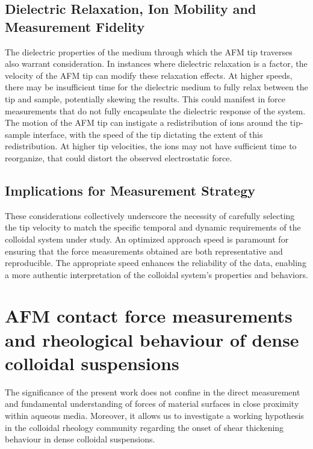 \subsection{Dielectric Relaxation, Ion Mobility and Measurement Fidelity}
The dielectric properties of the medium through which the AFM tip traverses also warrant consideration. In instances where dielectric relaxation is a factor, the velocity of the AFM tip can modify these relaxation effects. At higher speeds, there may be insufficient time for the dielectric medium to fully relax between the tip and sample, potentially skewing the results. This could manifest in force measurements that do not fully encapsulate the dielectric response of the system. The motion of the AFM tip can instigate a redistribution of ions around the tip-sample interface, with the speed of the tip dictating the extent of this redistribution. At higher tip velocities, the ions may not have sufficient time to reorganize, that could distort the observed electrostatic force. 

\subsection{Implications for Measurement Strategy}
These considerations collectively underscore the necessity of carefully selecting the tip velocity to match the specific temporal and dynamic requirements of the colloidal system under study. An optimized approach speed is paramount for ensuring that the force measurements obtained are both representative and reproducible. The appropriate speed enhances the reliability of the data, enabling a more authentic interpretation of the colloidal system's properties and behaviors.


\section*{AFM contact force measurements and rheological behaviour of dense colloidal suspensions}

The significance of the present work does not confine in the direct measurement and fundamental understanding of forces of material surfaces in close proximity within aqueous media. Moreover, it allows us to investigate a working hypothesis in the colloidal rheology community regarding the onset of shear thickening behaviour in dense colloidal suspensions.~\cite{reference1}

